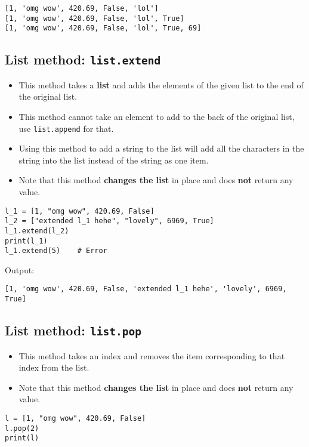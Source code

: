 \documentclass[11pt]{article}
\begin{document}
\begin{verbatim}
[1, 'omg wow', 420.69, False, 'lol']
[1, 'omg wow', 420.69, False, 'lol', True]
[1, 'omg wow', 420.69, False, 'lol', True, 69]
\end{verbatim}


 \newpage

\subsection{List method: \texttt{list.extend}}
\label{sec:org9288b57}
\begin{itemize}
\item This method takes a \textbf{list} and adds the elements of the given list to the end of the original list.
\item This method cannot take an element to add to the back of the original list, use \texttt{list.append} for that.
\item Using this method to add a string to the list will add all the characters in the string into the list instead of the string as one item.
\item Note that this method \textbf{changes the list} in place and does \textbf{not} return any value.
\end{itemize}

\begin{verbatim}
l_1 = [1, "omg wow", 420.69, False]
l_2 = ["extended l_1 hehe", "lovely", 6969, True]
l_1.extend(l_2)
print(l_1)
l_1.extend(5)    # Error
\end{verbatim}

 \noindent Output:

\begin{verbatim}
[1, 'omg wow', 420.69, False, 'extended l_1 hehe', 'lovely', 6969, True]
\end{verbatim}

\subsection{List method: \texttt{list.pop}}
\label{sec:org90def7f}
\begin{itemize}
\item This method takes an index and removes the item corresponding to that index from the list.
\item Note that this method \textbf{changes the list} in place and does \textbf{not} return any value.
\end{itemize}
\begin{verbatim}
l = [1, "omg wow", 420.69, False]
l.pop(2)
print(l)
\end{verbatim}
\end{document}
